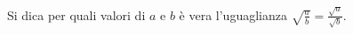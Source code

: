 Si dica per quali valori di $a$ e $b$ è vera l'uguaglianza 
$\sqrt{\frac{a}{b}} = \frac{\sqrt{a}}{\sqrt{b}}$.
